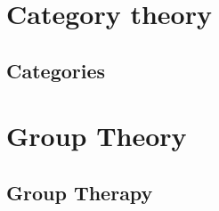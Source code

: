 \part{Category theory}

\chapter{Categories}








%
%
%
%
%
%
%
%


%
%
%
%
%

\part{Group Theory}

\chapter{Group Therapy}



